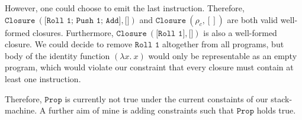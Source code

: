 \documentclass[11pt]{article}
\begin{document}
However, one could choose to emit the last instruction. Therefore, \\ $\texttt{Closure}\ (\texttt{[Roll 1; Push 1; Add]}, \texttt{[]})$ and $\texttt{Closure}\ (\rho_c, [])$ are both valid well-formed closures. Furthermore, $\texttt{Closure}\ (\texttt{[Roll 1]}, \texttt{[]})$ is also a well-formed closure. We could decide to remove $\texttt{Roll 1}$ altogether from all programs, but body of the identity function $(\lambda x.\ x)$ would only be representable as an empty program, which would violate our constraint that every closure must contain at least one instruction.

Therefore, $\texttt{Prop}$ is currently not true under the current constaints of our stack-machine. A further aim of mine is adding constraints such that $\texttt{Prop}$ holds true. 
\end{document}
